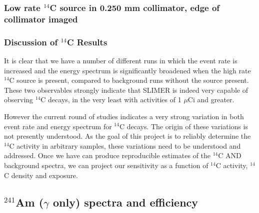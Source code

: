 \documentclass[11pt]{article}
\newcommand{\nuc}[2]{\ensuremath{^{#1}}#2}
\begin{document}
\subsubsection{Low rate \nuc{14}{C} source in 0.250 mm collimator, edge of collimator imaged} 


\subsubsection{Discussion of \nuc{14}{C} Results}
It is clear that we have a number of different runs in which the event rate is increased and the energy spectrum is significantly broadened when the high rate \nuc{14}{C} source is present, compared to background runs without the source present. 
These two observables strongly indicate that SLIMER is indeed very capable of observing \nuc{14}{C} decays, in the very least with activities of 1 $\mu$Ci and greater.  

However the current round of studies indicates a very strong variation in both event rate and energy spectrum for \nuc{14}{C} decays. The origin of these variations is not presently understood.
As the goal of this project is to reliably determine the \nuc{14}{C} activity in arbitrary samples, these variations need to be understood and addressed.  
Once we have can produce reproducible estimates of the \nuc{14}{C} AND background spectra, we can project our sensitivity as a function of \nuc{14}{C} activity, \nuc{14}{C} density and exposure.
 
\subsection{\nuc{241}{Am} ($\gamma$ only) spectra and efficiency}
\end{document}
